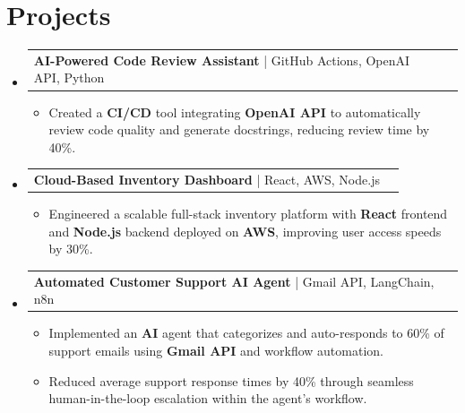 \documentclass[letterpaper,11pt]{article}
\makeatletter
\newcommand{\resumeItem}[1]{
  \item\footnotesize{
    {#1 \vspace{-2pt}}
  }
}
\newcommand{\resumeProjectHeading}[2]{
    \item
    \begin{tabular*}{1.001\textwidth}{l@{\extracolsep{\fill}}r}
      \small#1 & \textbf{\small #2}\\
    \end{tabular*}\vspace{-7pt}
}
\newcommand{\resumeSubHeadingListStart}{\begin{itemize}[leftmargin=0pt, label={}]}
\newcommand{\resumeSubHeadingListEnd}{\end{itemize}}
\newcommand{\resumeItemListStart}{\begin{itemize}[leftmargin=*]}
\newcommand{\resumeItemListEnd}{\end{itemize}\vspace{-5pt}}
\makeatother
\begin{document}
\section{Projects}
    \vspace{-5pt}
    \resumeSubHeadingListStart
      \resumeProjectHeading
          {\textbf{AI-Powered Code Review Assistant} | GitHub Actions, OpenAI API, Python}{}
          \resumeItemListStart
              \resumeItem{Created a \textbf{CI/CD} tool integrating \textbf{OpenAI API} to automatically review code quality and generate docstrings, reducing review time by 40\%.}
          \resumeItemListEnd
          \vspace{-12pt}
      \resumeProjectHeading
          {\textbf{Cloud-Based Inventory Dashboard} | React, AWS, Node.js}{}
          \resumeItemListStart
              \resumeItem{Engineered a scalable full-stack inventory platform with \textbf{React} frontend and \textbf{Node.js} backend deployed on \textbf{AWS}, improving user access speeds by 30\%.}
          \resumeItemListEnd
          \vspace{-12pt}
      \resumeProjectHeading
          {\textbf{Automated Customer Support AI Agent} | Gmail API, LangChain, n8n}{}
          \resumeItemListStart
              \resumeItem{Implemented an \textbf{AI} agent that categorizes and auto-responds to 60\% of support emails using \textbf{Gmail API} and workflow automation.}
              \resumeItem{Reduced average support response times by 40\% through seamless human-in-the-loop escalation within the agent’s workflow.}
          \resumeItemListEnd
    \resumeSubHeadingListEnd
\end{document}
